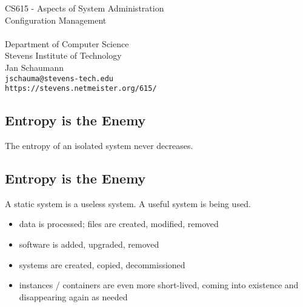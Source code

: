 \documentclass[xga]{xdvislides}
\begin{document}
\setfontphv

\lhead{\slidetitle}                               %
\cfoot{\relax}                               %
\rfoot{\Gray{\today}}

\newcommand{\smallish}{\fontsize{16}{16}\selectfont}

\vspace*{\fill}
\begin{center}
	\Hugesize
		CS615 - Aspects of System Administration\\ [1em]
		Configuration Management\\ [1em]
	\hspace*{5mm}\blueline\\ [1em]
	\Normalsize
		Department of Computer Science\\
		Stevens Institute of Technology\\
		Jan Schaumann\\
		\verb+jschauma@stevens-tech.edu+ \\
		\verb+https://stevens.netmeister.org/615/+
\end{center}
\vspace*{\fill}

\subsection{Entropy is the Enemy}
\vfill
\Huge
\begin{center}
The entropy of an isolated system never decreases.
\end{center}
\Normalsize
\vfill

\subsection{Entropy is the Enemy}
A static system is a useless system.
A useful system is being used.
\vspace{.5in}
\begin{itemize}
	\item data is processed; files are created, modified, removed
	\item software is added, upgraded, removed
	\item systems are created, copied, decommissioned
	\item instances / containers are even more short-lived,
		coming into existence and disappearing again as needed
\end{itemize}
\end{document}

